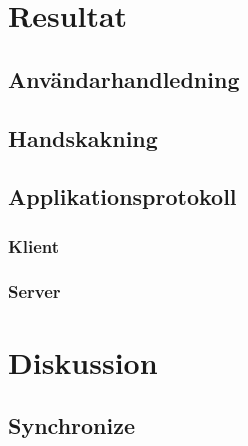 \documentclass[10pt, titlepage, oneside, a4paper]{article}
\begin{document}
	\section{Resultat}
		\subsection{Användarhandledning}
		
		\subsection{Handskakning}
		\subsection{Applikationsprotokoll}
			\subsubsection{Klient}
			\subsubsection{Server}
	\section{Diskussion}
		\subsection{Synchronize}
    
    
\end{document}
